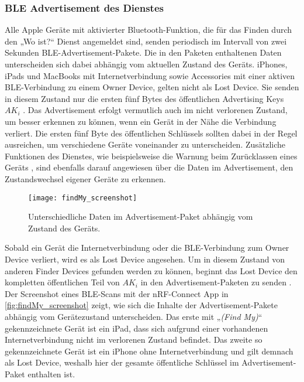\subsubsection{\ac{BLE} Advertisement des Dienstes}
\label{sec:advertisement}
Alle Apple Geräte mit aktivierter Bluetooth-Funktion, die für das Finden durch den „Wo ist?“ Dienst angemeldet sind, senden periodisch im Intervall von zwei Sekunden \ac{BLE}-Advertisement-Pakete.
Die in den Paketen enthaltenen Daten unterscheiden sich dabei abhängig vom aktuellen Zustand des Geräts.
iPhones, iPads und MacBooks mit Internetverbindung sowie Accessories mit einer aktiven \ac{BLE}-Verbindung zu einem Owner Device, gelten nicht als Lost Device.
Sie senden in diesem Zustand nur die ersten fünf Bytes des öffentlichen Advertising Keys $AK_i$ \cite{Apple_FindMySpec}.
Das Advertisement erfolgt vermutlich auch im nicht verlorenen Zustand, um besser erkennen zu können, wenn ein Gerät in der Nähe die Verbindung verliert.
Die ersten fünf Byte des öffentlichen Schlüssels sollten dabei in der Regel ausreichen, um verschiedene Geräte voneinander zu unterscheiden. 
Zusätzliche Funktionen des Dienstes, wie beispielsweise die Warnung beim Zurücklassen eines Geräts \cite{Apple_FindMyWarning}, sind ebenfalls darauf angewiesen über die Daten im Advertisement, den Zustandswechsel eigener Geräte zu erkennen.
\begin{figure}[ht]
    \centering
    \texttt{[image: findMy\_screenshot]}
    \caption{Unterschiedliche Daten im Advertisement-Paket abhängig vom Zustand des Geräts.}
    \label{fig:findMy_screenshot}
\end{figure}

Sobald ein Gerät die Internetverbindung oder die \ac{BLE}-Verbindung zum Owner Device verliert, wird es als Lost Device angesehen.
Um in diesem Zustand von anderen Finder Devices gefunden werden zu können, beginnt das Lost Device den kompletten öffentlichen Teil von $AK_i$ in den Advertisement-Paketen zu senden \cite{Apple_FindMySpec}.
Der Screenshot eines \ac{BLE}-Scans mit der nRF-Connect App in \autoref{fig:findMy_screenshot} zeigt, wie sich die Inhalte der Advertisement-Pakete abhängig vom Gerätezustand unterscheiden.
Das erste mit „\textit{(Find My)}“ gekennzeichnete Gerät ist ein iPad, dass sich aufgrund einer vorhandenen Internetverbindung nicht im verlorenen Zustand befindet.
Das zweite so gekennzeichnete Gerät ist ein iPhone ohne Internetverbindung und gilt demnach als Lost Device, weshalb hier der gesamte öffentliche Schlüssel im Advertisement-Paket enthalten ist.

